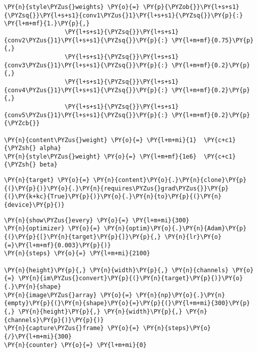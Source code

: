     \begin{tcolorbox}[breakable, size=fbox, boxrule=1pt, pad at break*=1mm,colback=cellbackground, colframe=cellborder]
\begin{Verbatim}[commandchars=\\\{\}]
\PY{n}{style\PYZus{}weights} \PY{o}{=} \PY{p}{\PYZob{}}\PY{l+s+s1}{\PYZsq{}}\PY{l+s+s1}{conv1\PYZus{}1}\PY{l+s+s1}{\PYZsq{}}\PY{p}{:} \PY{l+m+mf}{1.}\PY{p}{,}
                 \PY{l+s+s1}{\PYZsq{}}\PY{l+s+s1}{conv2\PYZus{}1}\PY{l+s+s1}{\PYZsq{}}\PY{p}{:} \PY{l+m+mf}{0.75}\PY{p}{,}
                 \PY{l+s+s1}{\PYZsq{}}\PY{l+s+s1}{conv3\PYZus{}1}\PY{l+s+s1}{\PYZsq{}}\PY{p}{:} \PY{l+m+mf}{0.2}\PY{p}{,}
                 \PY{l+s+s1}{\PYZsq{}}\PY{l+s+s1}{conv4\PYZus{}1}\PY{l+s+s1}{\PYZsq{}}\PY{p}{:} \PY{l+m+mf}{0.2}\PY{p}{,}
                 \PY{l+s+s1}{\PYZsq{}}\PY{l+s+s1}{conv5\PYZus{}1}\PY{l+s+s1}{\PYZsq{}}\PY{p}{:} \PY{l+m+mf}{0.2}\PY{p}{\PYZcb{}}

\PY{n}{content\PYZus{}weight} \PY{o}{=} \PY{l+m+mi}{1}  \PY{c+c1}{\PYZsh{} alpha}
\PY{n}{style\PYZus{}weight} \PY{o}{=} \PY{l+m+mf}{1e6}  \PY{c+c1}{\PYZsh{} beta}
\end{Verbatim}
\end{tcolorbox}

    \begin{tcolorbox}[breakable, size=fbox, boxrule=1pt, pad at break*=1mm,colback=cellbackground, colframe=cellborder]
\begin{Verbatim}[commandchars=\\\{\}]
\PY{n}{target} \PY{o}{=} \PY{n}{content}\PY{o}{.}\PY{n}{clone}\PY{p}{(}\PY{p}{)}\PY{o}{.}\PY{n}{requires\PYZus{}grad\PYZus{}}\PY{p}{(}\PY{k+kc}{True}\PY{p}{)}\PY{o}{.}\PY{n}{to}\PY{p}{(}\PY{n}{device}\PY{p}{)}
\end{Verbatim}
\end{tcolorbox}

    \begin{tcolorbox}[breakable, size=fbox, boxrule=1pt, pad at break*=1mm,colback=cellbackground, colframe=cellborder]
\begin{Verbatim}[commandchars=\\\{\}]
\PY{n}{show\PYZus{}every} \PY{o}{=} \PY{l+m+mi}{300}
\PY{n}{optimizer} \PY{o}{=} \PY{n}{optim}\PY{o}{.}\PY{n}{Adam}\PY{p}{(}\PY{p}{[}\PY{n}{target}\PY{p}{]}\PY{p}{,} \PY{n}{lr}\PY{o}{=}\PY{l+m+mf}{0.003}\PY{p}{)}
\PY{n}{steps} \PY{o}{=} \PY{l+m+mi}{2100}

\PY{n}{height}\PY{p}{,} \PY{n}{width}\PY{p}{,} \PY{n}{channels} \PY{o}{=} \PY{n}{im\PYZus{}convert}\PY{p}{(}\PY{n}{target}\PY{p}{)}\PY{o}{.}\PY{n}{shape}
\PY{n}{image\PYZus{}array} \PY{o}{=} \PY{n}{np}\PY{o}{.}\PY{n}{empty}\PY{p}{(}\PY{n}{shape}\PY{o}{=}\PY{p}{(}\PY{l+m+mi}{300}\PY{p}{,} \PY{n}{height}\PY{p}{,} \PY{n}{width}\PY{p}{,} \PY{n}{channels}\PY{p}{)}\PY{p}{)}
\PY{n}{capture\PYZus{}frame} \PY{o}{=} \PY{n}{steps}\PY{o}{/}\PY{l+m+mi}{300}
\PY{n}{counter} \PY{o}{=} \PY{l+m+mi}{0}
\end{Verbatim}
\end{tcolorbox}

